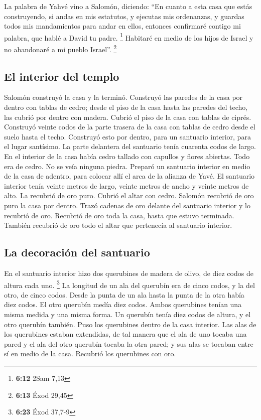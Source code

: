  La palabra de Yahvé vino a Salomón, diciendo:
 ``En cuanto a esta casa que estás construyendo, si andas
en mis estatutos, y ejecutas mis ordenanzas, y guardas todos mis
mandamientos para andar en ellos, entonces confirmaré contigo mi
palabra, que hablé a David tu padre. \footnote{\textbf{6:12} 2Sam 7,13}
 Habitaré en medio de los hijos de Israel y no abandonaré
a mi pueblo Israel''. \footnote{\textbf{6:13} Éxod 29,45}

\hypertarget{el-interior-del-templo}{%
\subsection{El interior del templo}\label{el-interior-del-templo}}

 Salomón construyó la casa y la terminó. 
Construyó las paredes de la casa por dentro con tablas de cedro; desde
el piso de la casa hasta las paredes del techo, las cubrió por dentro
con madera. Cubrió el piso de la casa con tablas de ciprés.
 Construyó veinte codos de la parte trasera de la casa
con tablas de cedro desde el suelo hasta el techo. Construyó esto por
dentro, para un santuario interior, para el lugar santísimo.
 La parte delantera del santuario tenía cuarenta codos de
largo.  En el interior de la casa había cedro tallado con
capullos y flores abiertas. Todo era de cedro. No se veía ninguna
piedra.  Preparó un santuario interior en medio de la
casa de adentro, para colocar allí el arca de la alianza de Yavé.
 El santuario interior tenía veinte metros de largo,
veinte metros de ancho y veinte metros de alto. La recubrió de oro puro.
Cubrió el altar con cedro.  Salomón recubrió de oro puro
la casa por dentro. Trazó cadenas de oro delante del santuario interior
y lo recubrió de oro.  Recubrió de oro toda la casa,
hasta que estuvo terminada. También recubrió de oro todo el altar que
pertenecía al santuario interior.

\hypertarget{la-decoraciuxf3n-del-santuario}{%
\subsection{La decoración del
santuario}\label{la-decoraciuxf3n-del-santuario}}

 En el santuario interior hizo dos querubines de madera
de olivo, de diez codos de altura cada uno. \footnote{\textbf{6:23} Éxod
  37,7-9}  La longitud de un ala del querubín era de
cinco codos, y la del otro, de cinco codos. Desde la punta de un ala
hasta la punta de la otra había diez codos.  El otro
querubín medía diez codos. Ambos querubines tenían una misma medida y
una misma forma.  Un querubín tenía diez codos de altura,
y el otro querubín también.  Puso los querubines dentro
de la casa interior. Las alas de los querubines estaban extendidas, de
tal manera que el ala de uno tocaba una pared y el ala del otro querubín
tocaba la otra pared; y sus alas se tocaban entre sí en medio de la
casa.  Recubrió los querubines con oro.

